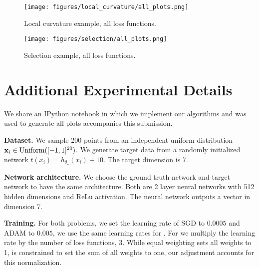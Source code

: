 \begin{figure}[htbp]
\centering
\begin{minipage}{0.9\textwidth}
    \centering
    \texttt{[image: figures/local\_curvature/all\_plots.png]}
    \caption{Local curvature example, all loss functions.}\label{fig:local_curvature_losses}
\end{minipage}

\vspace{1cm}

\begin{minipage}{0.9\textwidth}
    \centering
    \texttt{[image: figures/selection/all\_plots.png]}
    \caption{Selection example, all loss functions.}\label{fig:selection_losses}
\end{minipage}
\label{fig:subfigures}
\end{figure}

\section{Additional Experimental Details}\label{app:practical_implementation}

We share an IPython notebook in which we implement our algorithms and was used to generate all plots accompanies this submission.

\textbf{Dataset.}
We sample 200 points from an independent uniform distribution ${\mathbf{x}}_i\in \mathrm{Uniform}([-1,1]^{20})$. 
We generate target data from a randomly initialized network $t(x_i) = h_{\theta_\star}(x_i) + 10.$
The target dimension is $7$.

%
\textbf{Network architecture.}
We choose the ground truth network and target network to have the same architecture. Both are 2 layer neural networks with 512 hidden dimensions and ReLu activation. The neural network outputs a vector in dimension $7$.
%

\textbf{Training.}
For both problems, we set the learning rate of SGD to $0.0005$ and ADAM to $0.005$, we use the same learning rates for \PAMOO. For \CAMOO we multiply the learning rate by the number of loss functions, $3$. While equal weighting sets all weights to 1, \CAMOO is constrained to set the sum of all weights to one, our adjustment accounts for this normalization.
%


